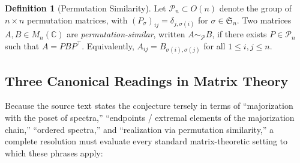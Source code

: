 \documentclass[11pt]{article}
\theoremstyle{definition}
\newtheorem{definition}[theorem]{Definition}
\theoremstyle{remark}
\newcommand{\C}{\mathbb{C}}
\newcommand{\Pn}{\mathcal{P}_n}
\begin{document}
\begin{definition}[Permutation Similarity]
\label{def:perm-sim}
Let $\Pn \subset O(n)$ denote the group of $n \times n$ permutation matrices,
with $(P_\sigma)_{ij} = \delta_{j,\sigma(i)}$ for $\sigma \in \mathfrak{S}_n$.
Two matrices $A, B \in M_n(\C)$ are \emph{permutation-similar}, written
$A \sim_{\mathcal{P}} B$, if there exists $P \in \Pn$ such that $A = P B P^\top$.
Equivalently, $A_{ij} = B_{\sigma(i),\sigma(j)}$ for all $1 \le i, j \le n$.
\end{definition}

\subsection{Three Canonical Readings in Matrix Theory}

Because the source text states the conjecture tersely in terms of ``majorization
with the poset of spectra,'' ``endpoints / extremal elements of the majorization
chain,'' ``ordered spectra,'' and ``realization via permutation similarity,'' a
complete resolution must evaluate every standard matrix-theoretic setting to which
these phrases apply:
\end{document}
